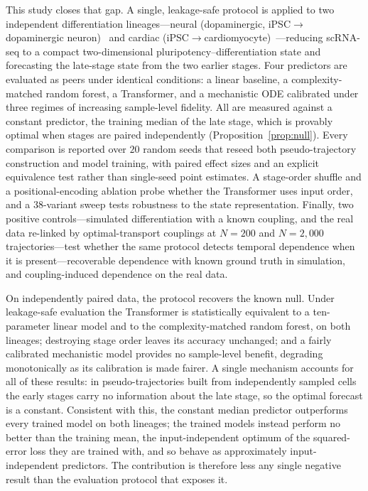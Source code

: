 \documentclass[10pt,letterpaper]{article}
\begin{document}
This study closes that gap. A single, leakage-safe protocol is applied to two independent differentiation lineages---neural (dopaminergic, iPSC$\rightarrow$dopaminergic neuron)~\cite{jerber2021population} and cardiac (iPSC$\rightarrow$cardiomyocyte)~\cite{elorbany2022single}---reducing scRNA-seq to a compact two-dimensional pluripotency--differentiation state and forecasting the late-stage state from the two earlier stages. Four predictors are evaluated as peers under identical conditions: a linear baseline, a complexity-matched random forest, a Transformer, and a mechanistic ODE calibrated under three regimes of increasing sample-level fidelity. All are measured against a constant predictor, the training median of the late stage, which is provably optimal when stages are paired independently (Proposition~\ref{prop:null}). Every comparison is reported over $20$ random seeds that reseed both pseudo-trajectory construction and model training, with paired effect sizes and an explicit equivalence test rather than single-seed point estimates. A stage-order shuffle and a positional-encoding ablation probe whether the Transformer uses input order, and a $38$-variant sweep tests robustness to the state representation. Finally, two positive controls---simulated differentiation with a known coupling, and the real data re-linked by optimal-transport couplings at $N=200$ and $N=2{,}000$ trajectories---test whether the same protocol detects temporal dependence when it is present---recoverable dependence with known ground truth in simulation, and coupling-induced dependence on the real data.

On independently paired data, the protocol recovers the known null. Under leakage-safe evaluation the Transformer is statistically equivalent to a ten-parameter linear model and to the complexity-matched random forest, on both lineages; destroying stage order leaves its accuracy unchanged; and a fairly calibrated mechanistic model provides no sample-level benefit, degrading monotonically as its calibration is made fairer. A single mechanism accounts for all of these results: in pseudo-trajectories built from independently sampled cells the early stages carry no information about the late stage, so the optimal forecast is a constant. Consistent with this, the constant median predictor outperforms every trained model on both lineages; the trained models instead perform no better than the training mean, the input-independent optimum of the squared-error loss they are trained with, and so behave as approximately input-independent predictors.  The contribution is therefore less any single negative result than the evaluation protocol that exposes it.
\end{document}
